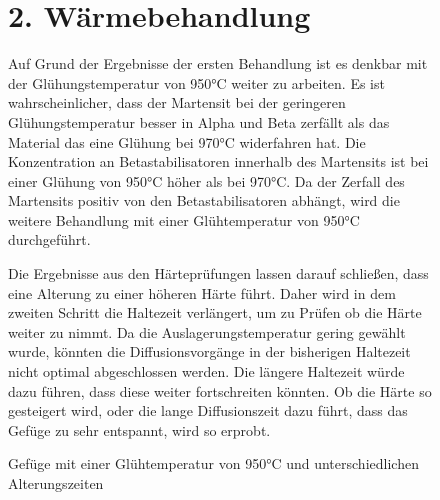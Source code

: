 \documentclass[a4paper, 11pt]{tubsreprt}
\begin{document}
\begin{figure} %

\section{2. Wärmebehandlung}
Auf Grund der Ergebnisse der ersten Behandlung ist es denkbar mit der Glühungstemperatur von 950°C weiter zu arbeiten. Es ist wahrscheinlicher, dass der Martensit bei der geringeren Glühungstemperatur besser in Alpha und Beta zerfällt als das Material das eine Glühung bei 970°C widerfahren hat. Die Konzentration an Betastabilisatoren innerhalb des Martensits ist bei einer Glühung von 950°C höher als bei 970°C. Da der Zerfall des Martensits positiv von den Betastabilisatoren abhängt, wird die weitere Behandlung mit einer Glühtemperatur von 950°C durchgeführt.

Die Ergebnisse aus den Härteprüfungen lassen darauf schließen, dass eine Alterung zu einer höheren Härte führt. Daher wird in dem zweiten Schritt die Haltezeit verlängert, um zu Prüfen ob die Härte weiter zu nimmt. Da die Auslagerungstemperatur gering gewählt wurde, könnten die Diffusionsvorgänge in der bisherigen Haltezeit nicht optimal abgeschlossen werden. Die längere Haltezeit würde dazu führen, dass diese weiter fortschreiten könnten. Ob die Härte so gesteigert wird, oder die lange Diffusionszeit dazu führt, dass das Gefüge zu sehr entspannt, wird so erprobt. 
    \caption{Gefüge mit einer Glühtemperatur von 950°C und unterschiedlichen Alterungszeiten}
    \label{Glühung950+alterung}
\end{figure}


\listoffigures
\listoftables
\end{document}
